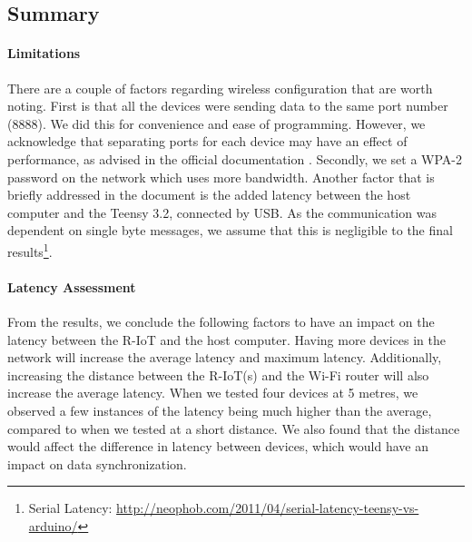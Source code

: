 \subsection{Summary}

\paragraph{Limitations}
\label{subsec:latency_limitations}
There are a couple of factors regarding wireless configuration that are worth noting. First is that all the devices were sending data to the same port number (8888). We did this for convenience and ease of programming. However, we acknowledge that separating ports for each device may have an effect of performance, as advised in the official documentation \cite{noauthor_bitalino_nodate}. Secondly, we set a WPA-2 password on the network which uses more bandwidth. Another factor that is briefly addressed in the document is the added latency between the host computer and the Teensy 3.2, connected by USB. As the communication was dependent on single byte messages, we assume that this is negligible to the final results\footnote{Serial Latency: \url{http://neophob.com/2011/04/serial-latency-teensy-vs-arduino/}}.

\paragraph{Latency Assessment}

From the results, we conclude the following factors to have an impact on the latency between the R-IoT and the host computer. Having more devices in the network will increase the average latency and maximum latency. Additionally, increasing the distance between the R-IoT(s) and the Wi-Fi router will also increase the average latency. When we tested four devices at 5 metres, we observed a few instances of the latency being much higher than the average, compared to when we tested at a short distance. We also found that the distance would affect the difference in latency between devices, which would have an impact on data synchronization.
